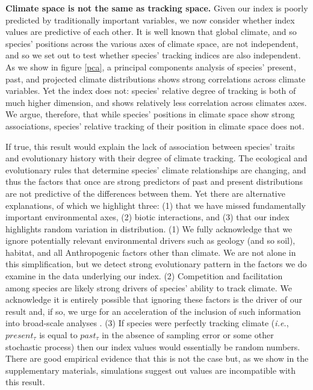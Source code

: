 \documentclass[12pt]{report}
\begin{document}
\textbf{Climate space is not the same as tracking space.} Given our
index is poorly predicted by traditionally important variables, we now
consider whether index values are predictive of each other. It is well
known that global climate\supercite{xxx}, and so species' positions
across the various axes of climate space\supercite{xxx}, are not
independent, and so we set out to test whether species' tracking
indices are also independent. As we show in figure \ref{pca}, a
principal components analysis of species' present, past, and projected
climate distributions shows strong correlations across climate
variables. Yet the index does not: species' relative degree of
tracking is both of much higher dimension, and shows relatively less
correlation across climates axes. We argue, therefore, that while
species' positions in climate space show strong associations, species'
relative tracking of their position in climate space does not.

If true, this result would explain the lack of association between
species' traits and evolutionary history with their degree of climate
tracking. The ecological and evolutionary rules that determine
species' climate relationships are changing, and thus the factors that
once are strong predictors of past and present distributions are not
predictive of the differences between them. Yet there are alternative
explanations, of which we highlight three: (1) that we have missed
fundamentally important environmental axes, (2) biotic interactions,
and (3) that our index highlights random variation in
distribution. (1) We fully acknowledge that we ignore potentially
relevant environmental drivers such as geology (and so soil), habitat,
and all Anthropogenic factors other than climate. We are not alone in
this simplification\supercite{xxx}, but we detect strong evolutionary
pattern in the factors we do examine in the data underlying our
index. (2) Competition and facilitation among species are likely
strong drivers of species' ability to track climate\supercite{xxx}. We
acknowledge it is entirely possible that ignoring these factors is the
driver of our result and, if so, we urge for an acceleration of the
inclusion of such information into broad-scale analyses
\supercite{xxx}. (3) If species were perfectly tracking climate
(\emph{i.e.}, $present_\tau$ is equal to $past_\tau$ in the absence of
sampling error or some other stochastic process) then our index values
would essentially be random numbers. There are good empirical evidence
that this is not the case \supercite{xxx} but, as we show in the
supplementary materials, simulations suggest out values are
incompatible with this result.
\end{document}
